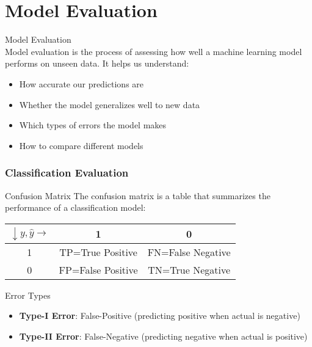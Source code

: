 \section{Model Evaluation}


\begin{definition}{Model Evaluation}\\
Model evaluation is the process of assessing how well a machine learning model performs on unseen data. It helps us understand:
\begin{itemize}
    \item How accurate our predictions are
    \item Whether the model generalizes well to new data
    \item Which types of errors the model makes
    \item How to compare different models
\end{itemize}
\end{definition}

\subsubsection{Classification Evaluation}



\begin{definition}{Confusion Matrix}
The confusion matrix is a table that summarizes the performance of a classification model:
\begin{center}
\begin{tabular}{|c|c|c|}
\hline
$\downarrow y, \hat{y} \rightarrow$ & 1 & 0 \\
\hline
1 & TP=True Positive & FN=False Negative \\
\hline
0 & FP=False Positive & TN=True Negative \\
\hline
\end{tabular}
\end{center}
\end{definition}

\begin{definition}{Error Types}
\begin{itemize}
    \item \textbf{Type-I Error}: False-Positive (predicting positive when actual is negative)
    \item \textbf{Type-II Error}: False-Negative (predicting negative when actual is positive)
\end{itemize}
\end{definition}

